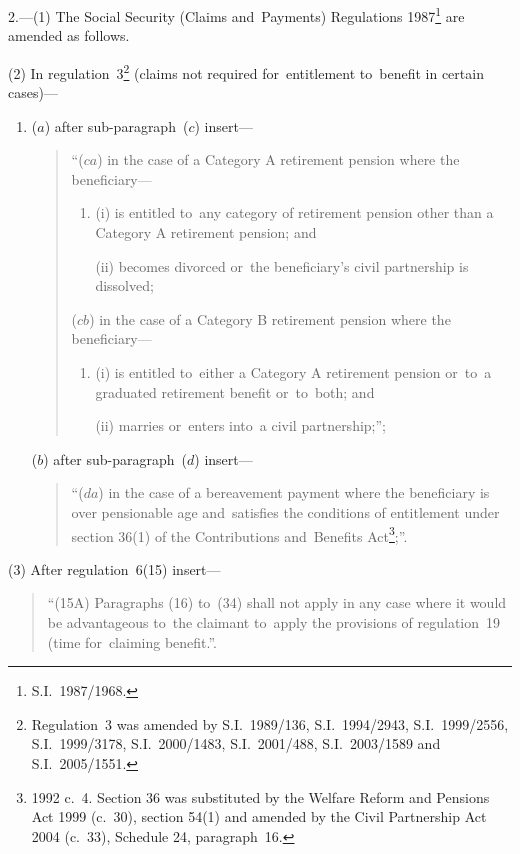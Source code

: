 \documentclass[12pt,a4paper]{article}
\begin{document}
2.---(1)  The Social Security (Claims and~Payments) Regulations 1987\footnote{S.I.~1987/1968.} are amended as follows.

(2) In regulation~3\footnote{Regulation~3 was amended by S.I.~1989/136, S.I.~1994/2943, S.I.~1999/2556, S.I.~1999/3178, S.I.~2000/1483, S.I.~2001/488, S.I.~2003/1589 and S.I.~2005/1551.} (claims not required for~entitlement to~benefit in certain cases)—
\begin{enumerate}\item[]
($a$) after sub-paragraph~($c$)  insert—
\begin{quotation}
“($ca$) in the case of a Category A retirement pension where the beneficiary—
\begin{enumerate}\item[]
(i) is entitled to~any category of retirement pension other than a Category A retirement pension; and

(ii) becomes divorced or~the beneficiary’s civil partnership is dissolved;
\end{enumerate}

($cb$) in the case of a Category B retirement pension where the beneficiary—
\begin{enumerate}\item[]
(i) is entitled to~either a Category A retirement pension or~to~a graduated retirement benefit or~to~both; and

(ii) marries or~enters into~a civil partnership;”;
\end{enumerate}
\end{quotation}

($b$) after sub-paragraph~($d$)  insert—
\begin{quotation}
“($da$) in the case of a bereavement payment where the beneficiary is over pensionable age and~satisfies the conditions of entitlement under section 36(1) of the Contributions and~Benefits Act\footnote{1992 c.~4. Section 36 was substituted by the Welfare Reform and Pensions Act 1999 (c.~30), section 54(1) and amended by the Civil Partnership Act 2004 (c.~33), Schedule 24, paragraph~16.};”.
\end{quotation}
\end{enumerate}

(3) After regulation~6(15) insert—
\begin{quotation}
“(15A) Paragraphs (16) to~(34) shall not apply in any case where it would be advantageous to~the claimant to~apply the provisions of regulation~19 (time for~claiming benefit.”.
\end{quotation}
\end{document}
